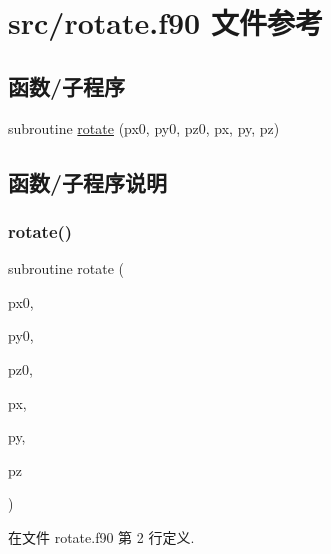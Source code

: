 \hypertarget{rotate_8f90}{}\section{src/rotate.f90 文件参考}
\label{rotate_8f90}
\subsection*{函数/子程序}
\begin{DoxyCompactItemize}
\item 
subroutine \mbox{\hyperlink{rotate_8f90_a3d502ab089e12b0819f9ebef1f5afd4c}{rotate}} (px0, py0, pz0, px, py, pz)
\end{DoxyCompactItemize}


\subsection{函数/子程序说明}
\mbox{\label{rotate_8f90_a3d502ab089e12b0819f9ebef1f5afd4c}} 
\subsubsection{\texorpdfstring{rotate()}{rotate()}}
{\footnotesize\ttfamily subroutine rotate (\begin{DoxyParamCaption}\item[{}]{px0,  }\item[{}]{py0,  }\item[{}]{pz0,  }\item[{}]{px,  }\item[{}]{py,  }\item[{}]{pz }\end{DoxyParamCaption})}



在文件 rotate.\+f90 第 2 行定义.

